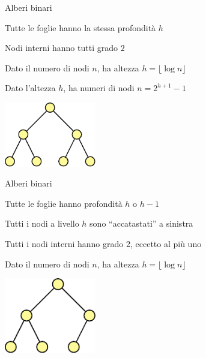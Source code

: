 \begin{frame}{Alberi binari}

\vspace{-9pt}
\begin{myboxtitle}
\BIL
\item Tutte le foglie hanno la stessa profondità $h$
\item Nodi interni hanno tutti grado $2$
\item Dato il numero di nodi $n$, ha altezza $h = \lfloor \log n \rfloor$
\item Dato l'altezza $h$, ha numeri di nodi $n=2^{h+1}-1$
\EIL
\end{myboxtitle}

\centering
\includegraphics[width=4cm]{perfetto.pdf}

\end{frame}

\begin{frame}{Alberi binari}

\vspace{-9pt}
\begin{myboxtitle}
\BIL
\item Tutte le foglie hanno profondità $h$ o $h-1$
\item Tutti i nodi a livello $h$ sono “accatastati” a sinistra
\item Tutti i nodi interni hanno grado 2, eccetto al più uno
\item Dato il numero di nodi $n$, ha altezza $h = \lfloor \log n \rfloor$
\EIL
\end{myboxtitle}

\centering
\includegraphics[width=4cm]{completo.pdf}

\end{frame}

